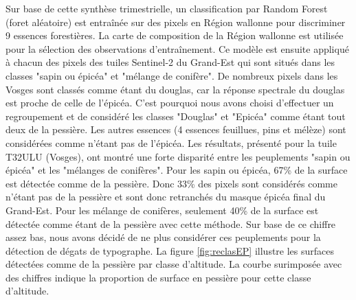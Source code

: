 \documentclass[a4paper, 12pt]{article} %
\begin{document}
Sur base de cette synthèse trimestrielle, un classification par Random Forest (foret aléatoire) est entraînée sur des pixels en Région wallonne pour discriminer 9 essences forestières. 
La carte de composition de la Région wallonne est utilisée pour la sélection des observations d'entraînement. 
Ce modèle est ensuite appliqué à chacun des pixels des tuiles Sentinel-2 du Grand-Est qui sont situés dans les classes "sapin ou épicéa" et "mélange de conifère".
De nombreux pixels dans les Vosges sont classés comme étant du douglas, car la réponse spectrale du douglas est proche de celle de l'épicéa. C'est pourquoi nous avons choisi d'effectuer un regroupement et de considéré les classes "Douglas" et "Epicéa" comme étant tout deux de la pessière. 
Les autres essences (4 essences feuillues, pins et mélèze) sont considérées comme n'étant pas de l'épicéa.
Les résultats, présenté pour la tuile T32ULU (Vosges), ont montré une forte disparité entre les peuplements "sapin ou épicéa" et les "mélanges de conifères". 
Pour les sapin ou épicéa, 67\% de la surface est détectée comme de la pessière. Donc 33\% des pixels sont considérés comme n'étant pas de la pessière et sont donc retranchés du masque épicéa final du Grand-Est.
Pour les mélange de conifères, seulement 40\% de la surface est détectée comme étant de la pessière avec cette méthode. Sur base de ce chiffre assez bas, nous avons décidé de ne plus considérer ces peuplements pour la détection de dégats de typographe.
La figure \ref{fig:reclasEP} illustre les surfaces détectées comme de la pessière par classe d'altitude. La courbe surimposée avec des chiffres indique la proportion de surface en pessière pour cette classe d'altitude.
\end{document}
